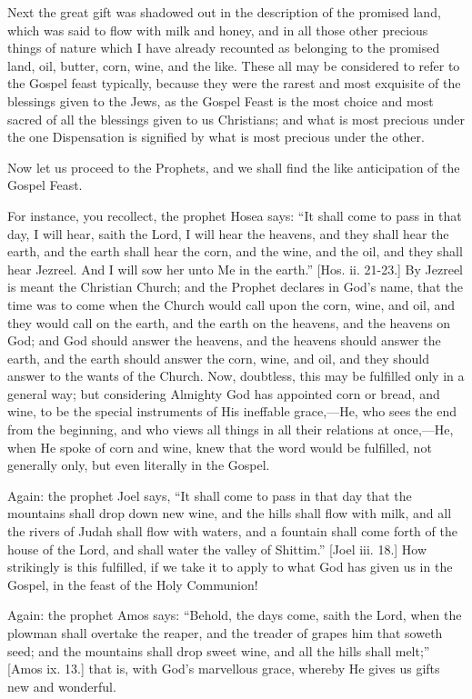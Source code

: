 Next the great gift was shadowed out in the description of the
promised land, which was said to flow with milk and honey, and in all
those other precious things of nature which I have already recounted
as belonging to the promised land, oil, butter, corn, wine, and the
like. These all may be considered to refer to the Gospel feast
typically, because they were the rarest and most exquisite of the
blessings given to the Jews, as the Gospel Feast is the most choice
and most sacred of all the blessings given to us Christians; and what
is most precious under the one Dispensation is signified by what is
most precious under the other.

Now let us proceed to the Prophets, and we shall find the like
anticipation of the Gospel Feast.

For instance, you recollect, the prophet Hosea says: ``It shall
come to pass in that day, I will hear, saith the Lord, I will hear the
heavens, and they shall hear the earth, and the earth shall hear the
corn, and the wine, and the oil, and they shall hear Jezreel. And I
will sow her unto Me in the earth.'' [Hos. ii. 21-23.] By Jezreel
is meant the Christian Church; and the Prophet declares in God's name,
that the time was to come when the Church would call upon the corn,
wine, and oil, and they would call on the earth, and the earth on the
heavens, and the heavens on God; and God should answer the heavens,
and the heavens should answer the earth, and the earth should answer
the corn, wine, and oil, and they should answer to the wants of the
Church. Now, doubtless, this may be fulfilled only in a general way;
but considering Almighty God has appointed corn or bread, and wine, to
be the special instruments of His ineffable grace,—He, who sees the
end from the beginning, and who views all things in all their
relations at once,—He, when He spoke of corn and wine, knew that the
word would be fulfilled, not generally only, but even literally in the
Gospel.

Again: the prophet Joel says, ``It shall come to pass in that
day that the mountains shall drop down new wine, and the hills shall
flow with milk, and all the rivers of Judah shall flow with waters,
and a fountain shall come forth of the house of the Lord, and shall
water the valley of Shittim.'' [Joel iii. 18.] How strikingly is
this fulfilled, if we take it to apply to what God has given us in the
Gospel, in the feast of the Holy Communion!

Again: the prophet Amos says: ``Behold, the days come, saith
the Lord, when the plowman shall overtake the reaper, and the treader
of grapes him that soweth seed; and the mountains shall drop sweet
wine, and all the hills shall melt;'' [Amos ix. 13.] that is, with
God's marvellous grace, whereby He gives us gifts new and wonderful.

